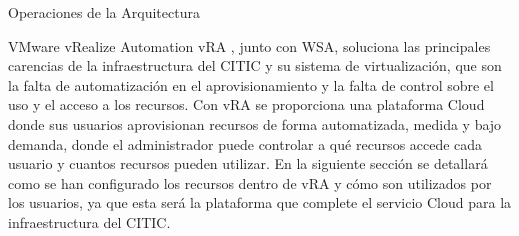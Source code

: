 \begin{subsection}{Operaciones de la Arquitectura}
\begin{subsubsection}{VMware vRealize Automation}
        vRA , junto con WSA, soluciona las principales carencias de la infraestructura del CITIC y su sistema de virtualización, que son la falta de automatización en el aprovisionamiento y la falta de control sobre el uso y el acceso a los recursos. Con vRA se proporciona una plataforma Cloud donde sus usuarios aprovisionan recursos de forma automatizada, medida y bajo demanda, donde el administrador puede controlar a qué recursos accede cada usuario y cuantos recursos pueden utilizar. En la siguiente sección se detallará como se han configurado los recursos dentro de vRA y cómo son utilizados por los usuarios, ya que esta será la plataforma que complete el servicio Cloud para la infraestructura del CITIC.


        



\end{subsubsection}
\end{subsection}
